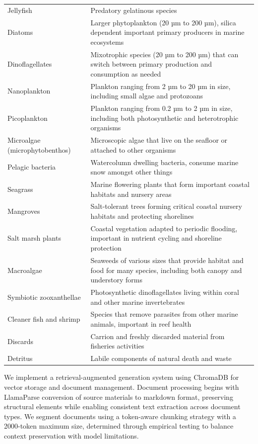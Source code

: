 \begin{longtable}{p{}p{}}
  Jellyfish & Predatory gelatinous species \\
  Diatoms & Larger phytoplankton (20 µm to 200 µm), silica dependent important primary producers in marine ecosystems \\
  Dinoflagellates & Mixotrophic species (20 µm to 200 µm) that can switch between primary production and consumption as needed \\
  Nanoplankton & Plankton ranging from 2 µm to 20 µm in size, including small algae and protozoans \\
  Picoplankton & Plankton ranging from 0.2 µm to 2 µm in size, including both photosynthetic and heterotrophic organisms \\
  Microalgae (microphytobenthos) & Microscopic algae that live on the seafloor or attached to other organisms \\
  Pelagic bacteria & Watercolumn dwelling bacteria, consume marine snow amongst other things \\
  Seagrass & Marine flowering plants that form important coastal habitats and nursery areas \\
  Mangroves & Salt-tolerant trees forming critical coastal nursery habitats and protecting shorelines \\
  Salt marsh plants & Coastal vegetation adapted to periodic flooding, important in nutrient cycling and shoreline protection \\
  Macroalgae & Seaweeds of various sizes that provide habitat and food for many species, including both canopy and understory forms \\
  Symbiotic zooxanthellae & Photosynthetic dinoflagellates living within coral and other marine invertebrates \\
  Cleaner fish and shrimp & Species that remove parasites from other marine animals, important in reef health \\
  Discards & Carrion and freshly discarded material from fisheries activities \\
  Detritus & Labile components of natural death and waste \\
  \end{longtable}
  
  \label{supp:rag_implementation}
  
  We implement a retrieval-augmented generation system using ChromaDB for vector storage and document management. Document processing begins with LlamaParse conversion of source materials to markdown format, preserving structural elements while enabling consistent text extraction across document types. We segment documents using a token-aware chunking strategy with a 2000-token maximum size, determined through empirical testing to balance context preservation with model limitations.
  
